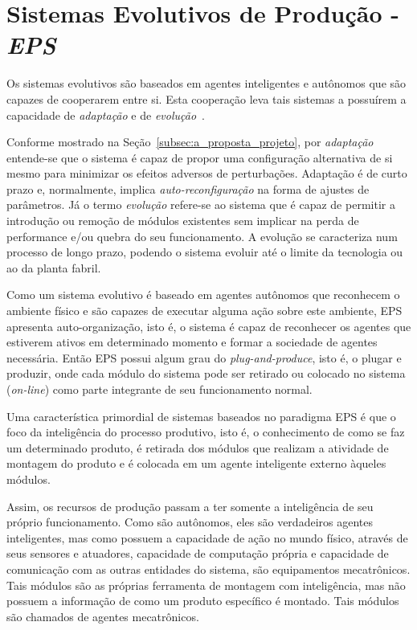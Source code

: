 \section{Sistemas Evolutivos de Produção - \textit{EPS}}

Os sistemas evolutivos são baseados em agentes inteligentes e autônomos que são capazes de cooperarem entre si. Esta cooperação leva tais sistemas a possuírem a capacidade de \textit{adaptação} e de \textit{evolução}~\cite{ONORI2002}.

Conforme mostrado na Seção~\ref{subsec:a_proposta_projeto}, por \textit{adaptação} entende-se que o sistema é capaz de propor uma configuração alternativa de si mesmo para minimizar os efeitos adversos de perturbações. Adaptação é de curto prazo e, normalmente, implica \textit{auto-reconfiguração} na forma de ajustes de parâmetros. Já o termo \textit{evolução} refere-se ao sistema que é capaz de permitir a introdução ou remoção de módulos existentes sem implicar na perda de performance e/ou quebra do seu funcionamento. A evolução se caracteriza num processo de longo prazo, podendo o sistema evoluir até o limite da tecnologia ou ao da planta fabril.

Como um sistema evolutivo é baseado em agentes autônomos que reconhecem o ambiente físico e são capazes de executar alguma ação sobre este ambiente, EPS apresenta auto-organização, isto é, o sistema é capaz de reconhecer os agentes que estiverem ativos em determinado momento e formar a sociedade de agentes necessária. Então EPS possui algum grau do \textit{plug-and-produce}, isto é, o plugar e produzir, onde cada módulo do sistema pode ser retirado ou colocado no sistema (\textit{on-line}) como parte integrante de seu funcionamento normal.

Uma característica primordial de sistemas baseados no paradigma EPS é que o foco da inteligência do processo produtivo, isto é, o conhecimento de como se faz um determinado produto, é retirada dos módulos que realizam a atividade de montagem do produto e é colocada em um agente inteligente externo àqueles módulos. 

Assim, os recursos de produção passam a ter somente a inteligência de seu próprio funcionamento. Como são autônomos, eles são verdadeiros agentes inteligentes, mas como possuem a capacidade de ação no mundo físico, através de seus sensores e atuadores, capacidade de computação própria e capacidade de comunicação com as outras entidades do sistema, são equipamentos mecatrônicos. Tais módulos são as próprias ferramenta de montagem com inteligência, mas não possuem a informação de como um produto específico é montado. Tais módulos são chamados de agentes mecatrônicos.

